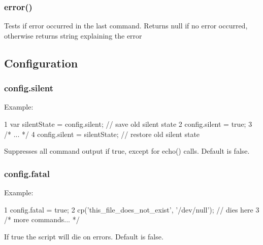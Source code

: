 \subsubsection*{error()}

Tests if error occurred in the last command. Returns {\ttfamily null} if no error occurred, otherwise returns string explaining the error

\subsection*{Configuration}

\subsubsection*{config.\+silent}

Example\+:


\begin{DoxyCode}
1 var silentState = config.silent; // save old silent state
2 config.silent = true;
3 /* ... */
4 config.silent = silentState; // restore old silent state
\end{DoxyCode}


Suppresses all command output if {\ttfamily true}, except for {\ttfamily echo()} calls. Default is {\ttfamily false}.

\subsubsection*{config.\+fatal}

Example\+:


\begin{DoxyCode}
1 config.fatal = true;
2 cp('this\_file\_does\_not\_exist', '/dev/null'); // dies here
3 /* more commands... */
\end{DoxyCode}


If {\ttfamily true} the script will die on errors. Default is {\ttfamily false}. 